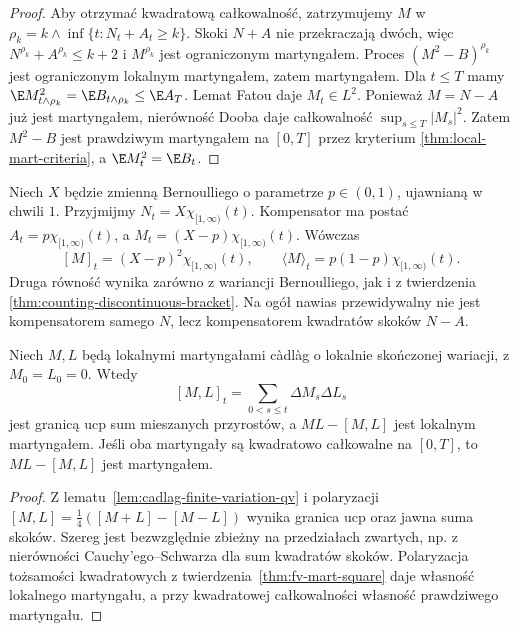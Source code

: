 \begin{proof}
Aby otrzymać kwadratową całkowalność,
zatrzymujemy $M$ w
$\rho_k=k\wedge\inf\{t:N_t+A_t\ge k\}$.
Skoki $N+A$ nie przekraczają dwóch,
więc $N^{\rho_k}+A^{\rho_k}\le k+2$
i $M^{\rho_k}$ jest ograniczonym martyngałem.
Proces $(M^2-B)^{\rho_k}$ jest ograniczonym
lokalnym martyngałem, zatem martyngałem.
Dla $t\le T$ mamy
$\E M_{t\wedge\rho_k}^2
=\E B_{t\wedge\rho_k}\le\E A_T$.
Lemat Fatou daje $M_t\in L^2$.
Ponieważ $M=N-A$ już jest martyngałem,
nierówność Dooba daje całkowalność
$\sup_{s\le T}|M_s|^2$.
Zatem $M^2-B$ jest prawdziwym martyngałem
na $[0,T]$ przez kryterium
\ref{thm:local-mart-criteria},
a $\E M_t^2=\E B_t$.
\end{proof}

\begin{przyklad}
Niech $X$ będzie zmienną Bernoulliego o parametrze
$p\in(0,1)$, ujawnianą w chwili $1$.
Przyjmijmy $N_t=X\chi_{[1,\infty)}(t)$.
Kompensator ma postać $A_t=p\chi_{[1,\infty)}(t)$,
a $M_t=(X-p)\chi_{[1,\infty)}(t)$.
Wówczas
\[
[M]_t=(X-p)^2\chi_{[1,\infty)}(t),\qquad
\langle M\rangle_t=p(1-p)\chi_{[1,\infty)}(t).
\]
Druga równość wynika zarówno z wariancji
Bernoulliego, jak i z twierdzenia
\ref{thm:counting-discontinuous-bracket}.
Na ogół nawias przewidywalny nie jest
kompensatorem samego $N$, lecz kompensatorem
kwadratów skoków $N-A$.
\end{przyklad}

\begin{twierdzenie}
\label{thm:fv-jump-cross-bracket}
Niech $M,L$ będą lokalnymi martyngałami c\`adl\`ag
o lokalnie skończonej wariacji, z $M_0=L_0=0$.
Wtedy
\[
[M,L]_t=\sum_{0<s\le t}\Delta M_s\Delta L_s
\]
jest granicą ucp sum mieszanych przyrostów,
a $ML-[M,L]$ jest lokalnym martyngałem.
Jeśli oba martyngały są kwadratowo całkowalne
na $[0,T]$, to $ML-[M,L]$ jest martyngałem.
\end{twierdzenie}
\begin{proof}
Z lematu~\ref{lem:cadlag-finite-variation-qv}
i polaryzacji
$[M,L]=\tfrac14([M+L]-[M-L])$
wynika granica ucp oraz jawna suma skoków.
Szereg jest bezwzględnie zbieżny na
przedziałach zwartych, np. z nierówności
Cauchy'ego--Schwarza dla sum kwadratów skoków.
Polaryzacja tożsamości kwadratowych
z twierdzenia~\ref{thm:fv-mart-square}
daje własność lokalnego martyngału,
a przy kwadratowej całkowalności
własność prawdziwego martyngału.
\end{proof}

